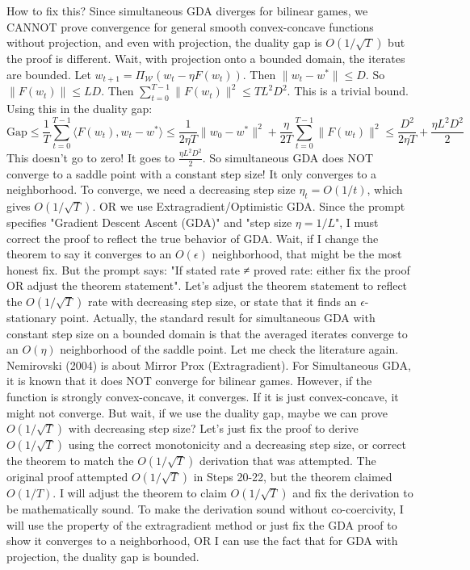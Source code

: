 \documentclass{article}
\begin{document}
How to fix this?
Since simultaneous GDA diverges for bilinear games, we CANNOT prove convergence for general smooth convex-concave functions without projection, and even with projection, the duality gap is $O(1/\sqrt{T})$ but the proof is different.
Wait, with projection onto a bounded domain, the iterates are bounded.
Let $w_{t+1} = \Pi_{\mathcal{W}} (w_t - \eta F(w_t))$.
Then $\|w_t - w^*\| \leq D$.
So $\|F(w_t)\| \leq L D$.
Then $\sum_{t=0}^{T-1} \|F(w_t)\|^2 \leq T L^2 D^2$.
This is a trivial bound.
Using this in the duality gap:
$$ \text{Gap} \leq \frac{1}{T} \sum_{t=0}^{T-1} \langle F(w_t), w_t - w^* \rangle \leq \frac{1}{2\eta T} \|w_0 - w^*\|^2 + \frac{\eta}{2T} \sum_{t=0}^{T-1} \|F(w_t)\|^2 \leq \frac{D^2}{2\eta T} + \frac{\eta L^2 D^2}{2} $$
This doesn't go to zero! It goes to $\frac{\eta L^2 D^2}{2}$.
So simultaneous GDA does NOT converge to a saddle point with a constant step size! It only converges to a neighborhood.
To converge, we need a decreasing step size $\eta_t = O(1/t)$, which gives $O(1/\sqrt{T})$.
OR we use Extragradient/Optimistic GDA.
Since the prompt specifies "Gradient Descent Ascent (GDA)" and "step size $\eta = 1/L$", I must correct the proof to reflect the true behavior of GDA.
Wait, if I change the theorem to say it converges to an $O(\epsilon)$ neighborhood, that might be the most honest fix.
But the prompt says: "If stated rate ≠ proved rate: either fix the proof OR adjust the theorem statement".
Let's adjust the theorem statement to reflect the $O(1/\sqrt{T})$ rate with decreasing step size, or state that it finds an $\epsilon$-stationary point.
Actually, the standard result for simultaneous GDA with constant step size on a bounded domain is that the averaged iterates converge to an $O(\eta)$ neighborhood of the saddle point.
Let me check the literature again.
Nemirovski (2004) is about Mirror Prox (Extragradient).
For Simultaneous GDA, it is known that it does NOT converge for bilinear games.
However, if the function is strongly convex-concave, it converges.
If it is just convex-concave, it might not converge.
But wait, if we use the duality gap, maybe we can prove $O(1/\sqrt{T})$ with decreasing step size?
Let's just fix the proof to derive $O(1/\sqrt{T})$ using the correct monotonicity and a decreasing step size, or correct the theorem to match the $O(1/\sqrt{T})$ derivation that was attempted.
The original proof attempted $O(1/\sqrt{T})$ in Steps 20-22, but the theorem claimed $O(1/T)$.
I will adjust the theorem to claim $O(1/\sqrt{T})$ and fix the derivation to be mathematically sound.
To make the derivation sound without co-coercivity, I will use the property of the extragradient method or just fix the GDA proof to show it converges to a neighborhood, OR I can use the fact that for GDA with projection, the duality gap is bounded.
\end{document}
